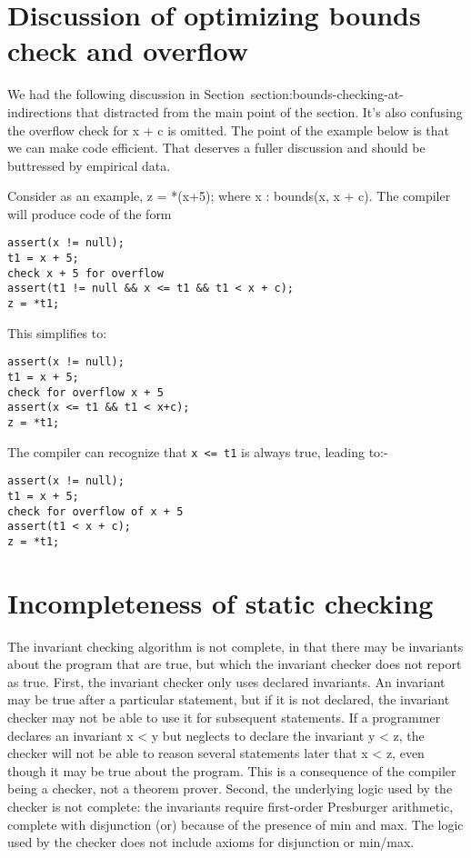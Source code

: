 \section{Discussion of optimizing bounds check and overflow}

We had the following discussion in Section~{section:bounds-checking-at-indirections}
that distracted from the
main point of the section. It's also confusing the overflow check for x
+ c is omitted. The point of the example below is that we can make code
efficient. That deserves a fuller discussion and should be buttressed by
empirical data.

Consider as an example, z = *(x+5); where x : bounds(x, x + c). The
compiler will produce code of the form

\begin{lstlisting}
assert(x != null);
t1 = x + 5;
check x + 5 for overflow
assert(t1 != null && x <= t1 && t1 < x + c);
z = *t1;
\end{lstlisting}

This simplifies to:

\begin{lstlisting}
assert(x != null);
t1 = x + 5;
check for overflow x + 5
assert(x <= t1 && t1 < x+c);
z = *t1;
\end{lstlisting}

The compiler can recognize that \texttt{x <= t1} is always true,
leading to:-

\begin{lstlisting}
assert(x != null);
t1 = x + 5;
check for overflow of x + 5
assert(t1 < x + c);
z = *t1;
\end{lstlisting}

\section{Incompleteness of static checking}

The invariant checking algorithm is not complete, in that there may be
invariants about the program that are true, but which the invariant
checker does not report as true. First, the invariant checker only uses
declared invariants. An invariant may be true after a particular
statement, but if it is not declared, the invariant checker may not be
able to use it for subsequent statements. If a programmer declares an
invariant x \textless{} y but neglects to declare the invariant y
\textless{} z, the checker will not be able to reason several statements
later that x \textless{} z, even though it may be true about the
program. This is a consequence of the compiler being a checker, not a
theorem prover. Second, the underlying logic used by the checker is not
complete: the invariants require first-order Presburger arithmetic,
complete with disjunction (or) because of the presence of min and max.
The logic used by the checker does not include axioms for disjunction or
min/max.

